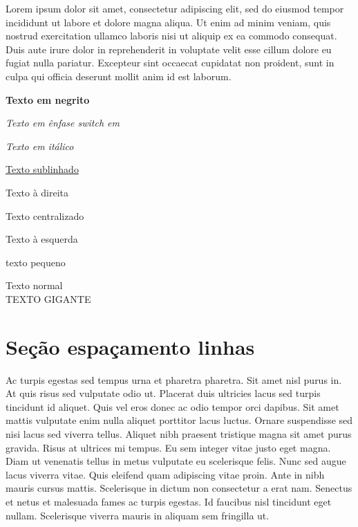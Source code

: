 \documentclass[12pt]{article}
\begin{document}
		Lorem ipsum dolor sit amet, consectetur adipiscing elit, sed do eiusmod tempor incididunt ut labore et dolore magna aliqua. Ut enim ad minim veniam, quis nostrud exercitation ullamco laboris nisi ut aliquip ex ea commodo consequat. Duis aute irure dolor in reprehenderit in voluptate velit esse cillum dolore eu fugiat nulla pariatur. Excepteur sint occaecat cupidatat non proident, sunt in culpa qui officia deserunt mollit anim id est laborum.
		\newpage %

	\textbf{Texto em negrito}
	
	{\em Texto em ênfase switch em}
	
	\textit{Texto em itálico}
	
	\underline{Texto sublinhado}
	
	\begin{flushright}
		Texto à direita
	\end{flushright}
	
	\begin{center}
		Texto centralizado
	\end{center}
	
	\begin{flushleft}
		Texto à esquerda
	\end{flushleft}
	
	\begin{tiny}
		texto pequeno \\ %
	\end{tiny}
	
	Texto normal \\ %
	
	{\Huge TEXTO GIGANTE}
	
	\newpage
	
	\section{Seção espaçamento linhas}
		\doublespacing %
		Ac turpis egestas sed tempus urna et pharetra pharetra. Sit amet nisl purus in. At quis risus sed vulputate odio ut. Placerat duis ultricies lacus sed turpis tincidunt id aliquet. Quis vel eros donec ac odio tempor orci dapibus. Sit amet mattis vulputate enim nulla aliquet porttitor lacus luctus. Ornare suspendisse sed nisi lacus sed viverra tellus. Aliquet nibh praesent tristique magna sit amet purus gravida. Risus at ultrices mi tempus. Eu sem integer vitae justo eget magna. Diam ut venenatis tellus in metus vulputate eu scelerisque felis. Nunc sed augue lacus viverra vitae. Quis eleifend quam adipiscing vitae proin. Ante in nibh mauris cursus mattis. Scelerisque in dictum non consectetur a erat nam. Senectus et netus et malesuada fames ac turpis egestas. Id faucibus nisl tincidunt eget nullam. Scelerisque viverra mauris in aliquam sem fringilla ut.
		
\end{document}
